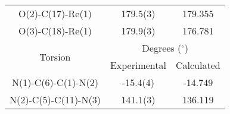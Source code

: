 \begin{table}[htbp]
\begin{tabular}{ccc}
    O(2)-C(17)-Re(1) & 179.5(3) & 179.355 \\
    O(3)-C(18)-Re(1) & 179.9(3) & 176.781 \\\midrule
    \multirow{2}{*}{Torsion} & \multicolumn{2}{c}{Degrees ($^\circ$)} \\ \cline{2-3}
     & Experimental & Calculated \\ \midrule
    N(1)-C(6)-C(1)-N(2) & -15.4(4) & -14.749 \\
    N(2)-C(5)-C(11)-N(3) & 141.1(3) & 136.119 \\
    \bottomrule
    \end{tabular}%
  \label{tab.da3}%
\end{table}%


